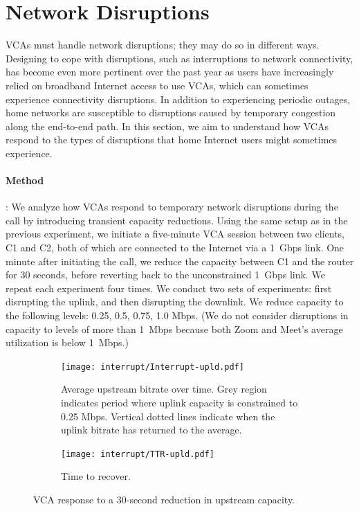 \section{Network Disruptions}
\label{sec:interruption}

VCAs must handle network disruptions; they may do so in different ways.
Designing to cope with disruptions, such as interruptions to network
connectivity, has become even more pertinent over the past year as users have
increasingly relied on broadband Internet access to use VCAs, which can
sometimes experience connectivity disruptions.  In addition to experiencing
periodic outages, home networks are susceptible to disruptions caused by
temporary congestion along the end-to-end path.
In this section, we aim to understand how VCAs respond to the types of
disruptions that home Internet users might sometimes experience. 


\paragraph{Method}:
We analyze how
VCAs respond to temporary network disruptions during the call by introducing
transient capacity reductions. Using the same setup as in
the previous experiment, we initiate a five-minute VCA session between
two clients, C1 and C2, both of which are connected to the Internet via a
1~Gbps link. One minute after initiating the call, we reduce the capacity
between C1 and the router for 30 seconds, before reverting back to the
unconstrained 1~Gbps link. We repeat each experiment four times.
We conduct two sets of experiments: first disrupting the uplink, and then
disrupting the downlink. We reduce capacity to the following
levels: {0.25, 0.5, 0.75, 1.0} Mbps. (We do not consider disruptions in capacity
to levels of more than 1~Mbps because both Zoom and Meet's average utilization
is below 1~Mbps.)

\begin{figure}[t!]
\centering
\begin{subfigure}[t]{.5\textwidth}
    \centering
    \texttt{[image: interrupt/Interrupt-upld.pdf]}
    \caption{Average upstream bitrate over time. Grey region indicates period where uplink capacity is constrained to 0.25 Mbps. Vertical dotted lines indicate when the uplink bitrate has returned to the average.}
    \label{fig:ts_upld}
\end{subfigure}\hfill
\begin{subfigure}[t]{.5\textwidth}
      \centering
    \texttt{[image: interrupt/TTR-upld.pdf]}
    \caption{Time to recover.}
    \label{fig:TTR_upld}
\end{subfigure}
\caption{VCA response to a 30-second reduction in upstream capacity.}
\label{fig:interrupt-upld}
\end{figure}

